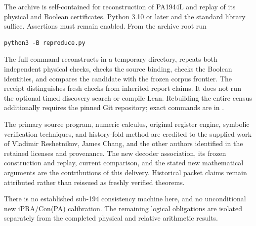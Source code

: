 \documentclass[10pt,letterpaper]{article}
\newcommand{\file}[1]{\path{#1}}
\begin{document}
The archive is self-contained for reconstruction of PA1944L and replay
of its physical and Boolean certificates. Python 3.10 or later and the
standard library suffice. Assertions must remain enabled. From the
archive root run
\begin{verbatim}
python3 -B reproduce.py
\end{verbatim}
The full command reconstructs in a temporary directory, repeats both
independent physical checks, checks the source binding, checks the Boolean
identities, and compares the candidate with the frozen corpus frontier.
The receipt distinguishes fresh checks from inherited report claims.
It does not run the optional timed discovery search or compile Lean.
Rebuilding the entire census additionally requires the pinned Git
repository; exact commands are in \file{comparison/assessment.txt}.

The primary source program, numeric calculus, original register engine,
symbolic verification techniques, and history-fold method are credited
to the supplied work of Vladimir Reshetnikov, James Chang, and the
other authors identified in the retained licenses and provenance.
The new decoder association, its frozen construction and replay,
current comparison, and the stated new mathematical arguments are the
contributions of this delivery. Historical packet claims remain
attributed rather than reissued as freshly verified theorems.

There is no established sub-194 consistency machine here, and no
unconditional new iPRA/Con(PA) calibration. The remaining logical
obligations are isolated separately from the completed physical
and relative arithmetic results.
\end{document}
